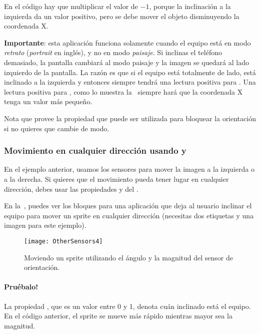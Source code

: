En el código hay que multiplicar el valor de  $-1$,
porque la inclinación a la izquierda da un valor positivo, pero se
debe mover el objeto disminuyendo la coordenada X.

\textbf{Importante}: esta aplicación funciona solamente cuando el
equipo está en modo \emph{retrato} (\emph{portrait} en inglés), y no
en modo \emph{paisaje}. Si inclinas el teléfono demasiado, la pantalla
cambiará al modo paisaje y la imagen se quedará al lado izquierdo de
la pantalla. La razón es que si el equipo está totalmente de lado,
está inclinado a la izquierda y entonces siempre tendrá una lectura
positiva para . Una lectura positiva para
, como lo muestra la~ siempre
hará que la coordenada X tenga un valor más pequeño.

Nota que \AppInventor provee la propiedad
 que puede ser utilizada para
bloquear la orientación si no quieres que cambie de modo.

\subsubsection*{Movimiento en cualquier dirección usando  y }

En el ejemplo anterior, usamos los sensores para mover la imagen a la
izquierda o a la derecha. Si quieres que el movimiento pueda tener
lugar en cualquier dirección, debes usar las propiedades
 y  del
.

En la~, puedes ver los bloques para una
aplicación que deja al usuario inclinar el equipo para mover un sprite
en cualquier dirección (necesitas dos etiquetas y una imagen para este
ejemplo).

\begin{figure}[H]
\centering
\texttt{[image: OtherSensors4]}
\caption{Moviendo un sprite utilizando el ángulo y la magnitud del
  sensor de orientación.}
\label{fig:OtherSensors4}
\end{figure}

\paragraph{Pruébalo!}

La propiedad , que es un valor entre 0 y 1, denota
cuán inclinado está el equipo. En el código anterior, el sprite se
mueve más rápido mientras mayor sea la magnitud.

